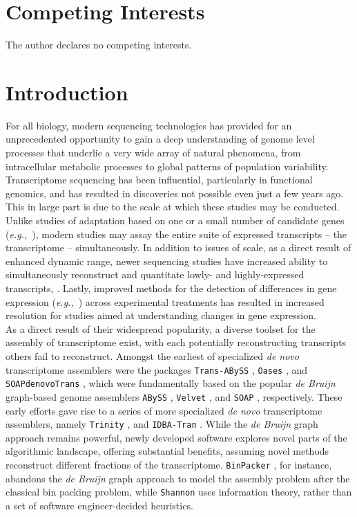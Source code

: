 \documentclass[10pt,letterpaper]{article}
\newcommand{\tit}{\textit}
\newcommand{\eg}{\textit{e.g.,}}
\begin{document}
\section*{Competing Interests} The author declares no competing interests.

\section{Introduction}

For all biology, modern sequencing technologies has provided for an unprecedented opportunity to gain a deep understanding of genome level processes that underlie a very wide array of natural phenomena, from intracellular metabolic processes to global patterns of population variability. Transcriptome sequencing has been influential, particularly in functional genomics, and has resulted in discoveries not possible even just a few years ago. This in large part is due to the scale at which these studies may be conducted. Unlike studies of adaptation based on one or a small number of candidate genes (\eg\ \citep{Fitzpatrick:2005vd,Panhuis:2006kp}), modern studies may assay the entire suite of expressed transcripts -- the transcriptome -- simultaneously. In addition to issues of scale, as a direct result of enhanced dynamic range, newer sequencing studies have increased ability to simultaneously reconstruct and quantitate lowly- and highly-expressed transcripts, \citep{Wolf:2013hd,Vijay:2012gy}. Lastly, improved methods for the detection of differences in gene expression (\eg\ \citep{Robinson:2010cw,Love:2014cf}) across experimental treatments has resulted in increased resolution for studies aimed at understanding changes in gene expression.    \\

As a direct result of their widespread popularity, a diverse toolset for the assembly of transcriptome exist, with each potentially reconstructing transcripts others fail to reconstruct. Amongst the earliest of specialized \tit{de novo} transcriptome assemblers were the packages \texttt{Trans-ABySS} \citep{Robertson:2010ih}, \texttt{Oases} \citep{Schulz:2012je}, and \texttt{SOAPdenovoTrans} \citep{Xie:2013wu}, which were fundamentally based on the popular \tit{de Bruijn} graph-based genome assemblers \texttt{ABySS} \citep{Simpson:2009iv}, \texttt{Velvet} \citep{Zerbino:2008bm}, and \texttt{SOAP} \cite{Li:2008in}, respectively. These early efforts gave rise to a series of more specialized \tit{de novo} transcriptome assemblers, namely \texttt{Trinity} \citep{Haas:2013jq}, and \texttt{IDBA-Tran} \citep{Peng:2013eu}. While the \tit{de Bruijn} graph approach remains powerful, newly developed software explores novel parts of the algorithmic landscape, offering substantial benefits, assuming novel methods reconstruct different fractions of the transcriptome. \texttt{BinPacker} \citep{Liu:2016hh}, for instance, abandons the \tit{de Bruijn} graph approach to model the assembly problem after the classical bin packing problem, while \texttt{Shannon} \citep{Kannan:2016be} uses information theory, rather than a set of software engineer-decided heuristics.  
\end{document}
